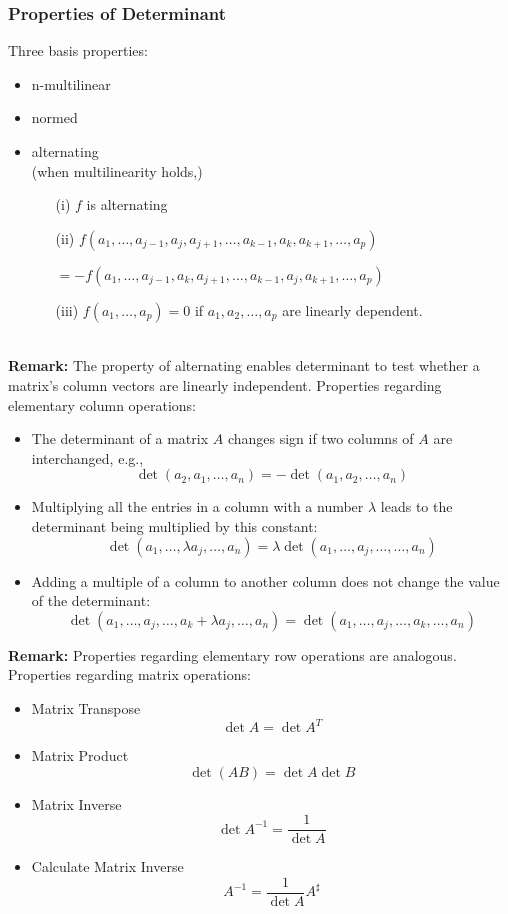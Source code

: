 \documentclass[12pt, t]{beamer}
\newcommand{\myseries}[2]{$#1_1,#1_2,\dots,#1_#2$}
\newcommand{\nullspace}{~\\[15pt]}
\newcommand{\remark}{\textbf{Remark: }}
\begin{document}
\begin{frame}[allowframebreaks]
    \frametitle{Properties of Determinant}
    Three basis properties:
    \begin{itemize}
        \item n-multilinear
        \item normed
        \item alternating\\
              (when multilinearity holds,)
              \begin{itemize}
                  \item[(i)] $f$ is alternating
                  \item[(ii)] $f(a_1,\ldots,a_{j-1},a_j,a_{j+1},\ldots,a_{k-1},a_k,a_{k+1},\ldots,a_p)$\\ \begin{flushright}
                            $=-f(a_1,\ldots,a_{j-1},a_k,a_{j+1},\ldots,a_{k-1},a_j,a_{k+1},\ldots,a_p)$
                        \end{flushright}
                  \item[(iii)] $f(a_1,\ldots,a_p)=0$ if \myseries{a}{p} are linearly dependent.
              \end{itemize}
    \end{itemize}
    \nullspace
    \remark The property of alternating enables determinant to test whether a matrix's column vectors are linearly independent.
    \newpage
    Properties regarding elementary column operations:
    \begin{itemize}
        \small
        \item The determinant of a matrix $A$ changes sign if two columns of $A$ are interchanged, e.g.,
              \[\det(a_2,a_1,\ldots,a_n)=-\det(a_1,a_2,\ldots,a_n)\]
        \item Multiplying all the entries in a column with a number $\lambda$ leads to the determinant being multiplied by this constant:
              \[\det(a_1,\ldots,\lambda a_j,\ldots,a_n)=\lambda\det(a_1,\ldots,a_j,\ldots,\ldots,a_n)\]
        \item Adding a multiple of a column to another column does not change the value of the determinant:
              \[\det(a_1,\ldots,a_j,\ldots,a_k+\lambda a_j,\ldots,a_n)=\det(a_1,\ldots,a_j,\ldots,a_k,\ldots,a_n)\]
    \end{itemize}
    \remark Properties regarding elementary row operations are analogous.
    \newpage
    Properties regarding matrix operations:
    \begin{itemize}
        \item Matrix Transpose$$\det A=\det A^T$$
        \item Matrix Product $$\det (AB)=\det A \det B$$
        \item Matrix Inverse $$\det A^{-1}=\dfrac{1}{\det A}$$
        \item Calculate Matrix Inverse\[A^{-1}=\frac{1}{\det A}A^{\sharp}\]
    \end{itemize}
\end{frame}
\end{document}
